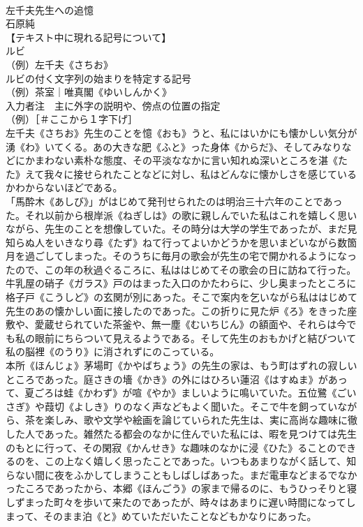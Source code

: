 \documentclass[8pt]{extreport}
\begin{document}
\begin{CJK}{UTF8}{min}
\\	左千夫先生への追憶
\\	石原純
\\	【テキスト中に現れる記号について】
\\	ルビ
\\	（例）左千夫《さちお》
\\	ルビの付く文字列の始まりを特定する記号
\\	（例）茶室｜唯真閣《ゆいしんかく》
\\	入力者注　主に外字の説明や、傍点の位置の指定
\\	（例）［＃ここから１字下げ］
\\	左千夫《さちお》先生のことを憶《おも》うと、私にはいかにも懐かしい気分が湧《わ》いてくる。あの大きな肥《ふと》った身体《からだ》、そしてみなりなどにかまわない素朴な態度、その平淡ななかに言い知れぬ深いところを湛《たた》えて我々に接せられたことなどに対し、私はどんなに懐かしさを感じているかわからないほどである。
\\	「馬酔木《あしび》」がはじめて発刊せられたのは明治三十六年のことであった。それ以前から根岸派《ねぎしは》の歌に親しんでいた私はこれを嬉しく思いながら、先生のことを想像していた。その時分は大学の学生であったが、まだ見知らぬ人をいきなり尋《たず》ねて行ってよいかどうかを思いまどいながら数箇月を過ごしてしまった。そのうちに毎月の歌会が先生の宅で開かれるようになったので、この年の秋過ぐるころに、私ははじめてその歌会の日に訪ねて行った。牛乳屋の硝子《ガラス》戸のはまった入口のかたわらに、少し奥まったところに格子戸《こうしど》の玄関が別にあった。そこで案内を乞いながら私ははじめて先生のあの懐かしい面に接したのであった。この折りに見た炉《ろ》をきった座敷や、愛蔵せられていた茶釜や、無一塵《むいちじん》の額面や、それらは今でも私の眼前にちらついて見えるようである。そして先生のおもかげと結びついて私の脳裡《のうり》に消されずにのこっている。
\\	本所《ほんじょ》茅場町《かやばちょう》の先生の家は、もう町はずれの寂しいところであった。庭さきの墻《かき》の外にはひろい蓮沼《はすぬま》があって、夏ごろは蛙《かわず》が喧《やか》ましいように鳴いていた。五位鷺《ごいさぎ》や葭切《よしき》りのなく声などもよく聞いた。そこで牛を飼っていながら、茶を楽しみ、歌や文学や絵画を論じていられた先生は、実に高尚な趣味に徹した人であった。雑然たる都会のなかに住んでいた私には、暇を見つけては先生のもとに行って、その閑寂《かんせき》な趣味のなかに浸《ひた》ることのできるのを、この上なく嬉しく思ったことであった。いつもあまりながく話して、知らない間に夜をふかしてしまうこともしばしばあった。まだ電車などまるでなかったころであったから、本郷《ほんごう》の家まで帰るのに、もうひっそりと寝しずまった町々を歩いて来たのであったが、時々はあまりに遅い時間になってしまって、そのまま泊《と》めていただいたことなどもかなりにあった。

\end{CJK}
\end{document}

